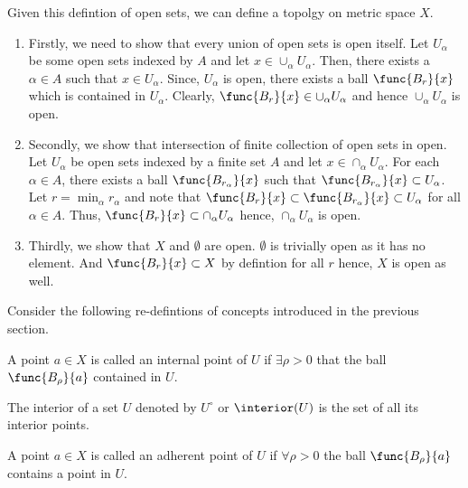 Given this defintion of open sets, we can define a topolgy on metric space \(X\). 
\begin{enumerate}
    \item Firstly, we need to show that every union of open sets is open itself. Let \(U_{\alpha}\) be some open sets indexed by \(A\) and let \(x \in \cup_{\alpha} U_{\alpha}\). Then, there exists a \(\alpha \in A\) such that \(x \in U_{\alpha}\). Since, \(U_{\alpha}\) is open, there exists a ball \(\func{B_r}{x}\) which is contained in \(U_{\alpha}\). Clearly, \(\func{B_r}{x} \in \cup_{\alpha} U_{\alpha}\) and hence \(\cup_{\alpha} U_{\alpha}\) is open.
    \item Secondly, we show that intersection of finite collection of open sets in open. Let \(U_{\alpha}\) be open sets indexed by a finite set \(A\) and let \(x \in \cap_{\alpha} U_{\alpha}\). For each \(\alpha \in A\), there exists a ball \(\func{B_{r_{\alpha}}}{x}\) such that \(\func{B_{r_{\alpha}}}{x} \subset U_{\alpha}\). Let \(r = \min_{\alpha} r_{\alpha}\) and note that \(\func{B_r}{x} \subset \func{B_{r_{\alpha}}}{x} \subset U_{\alpha}\) for all \(\alpha \in A\). Thus, \(\func{B_{r}}{x} \subset \cap_{\alpha} U_{\alpha}\) hence, \(\cap_{\alpha} U_{\alpha}\) is open.
    \item Thirdly, we show that \(X\) and \(\emptyset\) are open. \(\emptyset\) is trivially open as it has no element. And \(\func{B_r}{x} \subset X\)  by defintion for all \(r\) hence, \(X\) is open as well.
\end{enumerate}

Consider the following re-defintions of concepts introduced in the previous section.

\begin{definition} 
    A point \(a \in X\) is called an internal point of \(U\) if \(\exists \rho > 0\) that the ball \(\func{B_\rho}{a}\) contained in \(U\).
\end{definition}

\begin{definition} [Interior]
    The interior of a set \(U\) denoted by \(U^\circ\) or \(\interior (U)\) is the set of all its interior points.
\end{definition}

\begin{definition} 
    A point \(a \in X\) is called an adherent point of \(U\) if \(\forall \rho > 0\) the ball \(\func{B_\rho}{a}\) contains a point in \(U\).
\end{definition}

